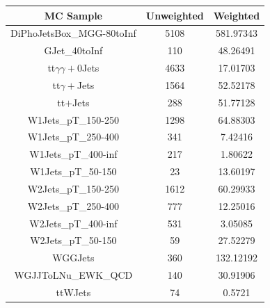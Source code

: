 \begin{table}[H]
  \begin{center}
          \begin{tabular}{c|c|c}
                  MC Sample & Unweighted & Weighted \\ \hline
                  DiPhoJetsBox\_MGG-80toInf & 5108 & 581.97343 \\
                  GJet\_40toInf & 110 & 48.26491 \\
                  tt$\gamma\gamma+$0Jets & 4633 & 17.01703 \\
                  tt$\gamma+$Jets & 1564 & 52.52178 \\
                  tt$+$Jets & 288 & 51.77128 \\
                  W1Jets\_pT\_150-250 & 1298 & 64.88303 \\
                  W1Jets\_pT\_250-400 & 341 & 7.42416 \\
                  W1Jets\_pT\_400-inf & 217 & 1.80622 \\
                  W1Jets\_pT\_50-150 & 23 & 13.60197 \\
                  W2Jets\_pT\_150-250 & 1612 & 60.29933 \\
                  W2Jets\_pT\_250-400 & 777 & 12.25016 \\
                  W2Jets\_pT\_400-inf & 531 & 3.05085 \\
                  W2Jets\_pT\_50-150 & 59 & 27.52279 \\
                  WGGJets & 360 & 132.12192 \\
                  WGJJToLNu\_EWK\_QCD & 140 & 30.91906 \\
                  ttWJets & 74 & 0.5721 \\ \hline                
          \end{tabular}
  \end{center}
\end{table}


